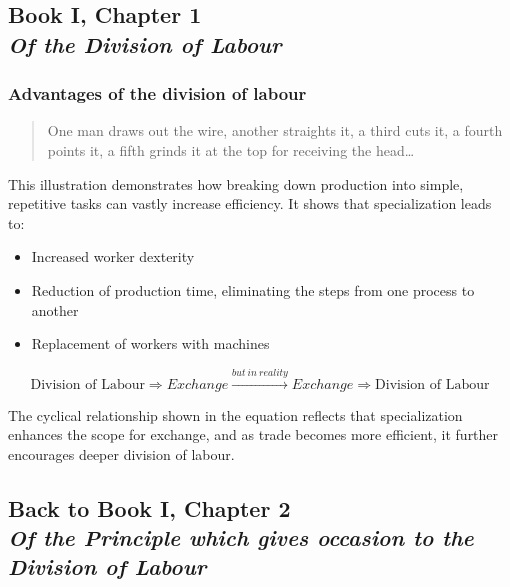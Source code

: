     \subsection[Of the Division of Labour]{Book I, Chapter 1\\
                \textit{Of the Division of Labour}}

        \subsubsection{Advantages of the division of labour}

            \begin{quote}
                One man draws out the wire, another straights it, a third cuts it, a fourth points it, a fifth grinds it at the top for receiving the head…
            \end{quote}

            This illustration demonstrates how breaking down production into simple, repetitive tasks can vastly increase efficiency. It shows that specialization leads to:

            \begin{itemize}
                \item Increased worker dexterity
                \item Reduction of production time, eliminating the steps from one process to another
                \item Replacement of workers with machines
            \end{itemize}

            \begin{equation}
                \text{Division of Labour} \Rightarrow Exchange \xrightarrow{but \ in \ reality}{} Exchange \Rightarrow \text{Division of Labour}
            \end{equation}

            The cyclical relationship shown in the equation reflects that specialization enhances the scope for exchange, and as trade becomes more efficient, it further encourages deeper division of labour.

    \subsection[Back to "Of the Principle which gives occasion to the Division of Labour"]{Back to Book I, Chapter 2 \\
                \textit{Of the Principle which gives occasion to the Division of Labour}}

